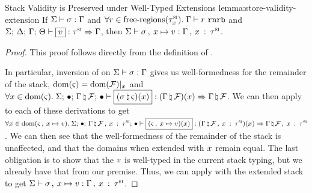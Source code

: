 \begin{oxlemma}{Stack Validity is Preserved under Well-Typed Extensions}
  {lemma:store-validity-extension} If
  $\Sigma \vdash \sigma : \Gamma$ and
  $\forall r \in \textrm{free-regions}(\tau^\textsc{si}_x). \;
  \Gamma \vdash r \ \mathtt{rnrb}$ and
  $\oxtypjudge{\oxglobalctx}{\oxtvarctx}{\oxkontctx}{\oxvarctx}{\oxvalue}
  {\oxsitype}{\oxvarctx}$, then $\Sigma \vdash 
    \sigma \, , \:  x \mapsto v  : 
    \Gamma \, , \:  x \: : \: \tau^\textsc{si} $.
\end{oxlemma}

\begin{proof}
  This proof follows directly from the definition of .
  
  \vspace{1em}
  \noindent \framebox[\textwidth]{ \figuresize
    \begin{mathpar}
      \VStack
    \end{mathpar}
  } \vspace{1em}

  In particular, inversion of  on
  $\Sigma \vdash \sigma : \Gamma$ gives us well-formedness
  for the remainder of the stack, $\textrm{dom}(\varsigma) =
  \textrm{dom}(\mathcal{F})|_x$ and $\forall \oxid \in \oxdomain{\oxstackframe}.
  \;
  \oxtypjudge{\oxglobalctx}{\oxemptyctx}{\oxemptyctx}{\oxnewframe{\oxvarctx}{\oxframe}}
  {(\oxnewframe{\oxstore}{\oxstackframe})(\oxid)}{(\oxnewframe{\oxvarctx}{\oxframe})(\oxid)}{\oxnewframe{\oxvarctx}{\oxframe}}$.
  We can then apply  to each of these
  derivations to get $\forall \oxid \in \oxdomain{ \oxextendctx{\oxstackframe}{
      \oxstoreentry{\oxid}{\oxvalue} } }. \;
  \oxtypjudge{\oxglobalctx}{\oxemptyctx}{\oxemptyctx}{
    \oxextendctx{\oxnewframe{\oxvarctx}{\oxframe}}{
      \oxvarctxentry{\oxid}{\oxsitype} } }{ (\oxextendctx{\oxstackframe}{
      \oxstoreentry{\oxid}{\oxvalue} })(\oxid) }{
    (\oxextendctx{\oxnewframe{\oxvarctx}{\oxframe}}{
      \oxvarctxentry{\oxid}{\oxsitype} })(\oxid) }{
    \oxextendctx{\oxnewframe{\oxvarctx}{\oxframe}}{
      \oxvarctxentry{\oxid}{\oxsitype} } }$. We can then see that the
  well-formedness of the remainder of the stack is unaffected, and that the
  domains when extended with $x$ remain equal. The last obligation is to
  show that the $v$ is well-typed in the current stack typing, but we
  already have that from our premise. Thus, we can apply 
  with the extended stack to get $\Sigma \vdash 
    \sigma \, , \:  x \mapsto v  : 
    \Gamma \, , \:  x \: : \: \tau^\textsc{si} $.
\end{proof}

